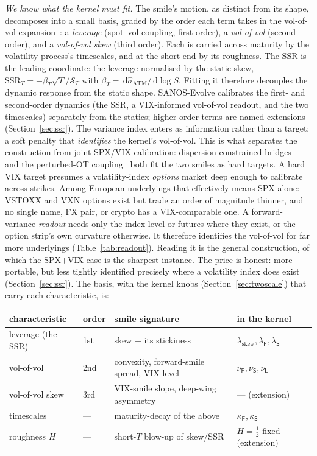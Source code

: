 \documentclass[11pt]{article}
\newcommand{\SSR}{\mathrm{SSR}}
\newcommand{\dd}{\,\mathrm{d}}
\begin{document}
\emph{We know what the kernel must fit.} The smile's motion, as distinct from its shape, decomposes
into a small basis, graded by the order each term takes in the vol-of-vol expansion~\cite{bergomi2016}:
a \emph{leverage} (spot--vol coupling, first order), a \emph{vol-of-vol} (second order), and a
\emph{vol-of-vol skew} (third order). Each is carried across maturity by the volatility process's
timescales, and at the short end by its roughness. The SSR is the leading coordinate: the leverage normalised by the static skew,
$\SSR_T=-\beta_T\sqrt{T}/\mathcal S_T$ with $\beta_T=\dd\widehat\sigma_{\mathrm{ATM}}/\dd\log S$.
Fitting it therefore decouples the dynamic response from the static shape. SANOS-Evolve calibrates the first- and second-order dynamics (the SSR, a VIX-informed
vol-of-vol readout, and the two timescales) separately from the statics; higher-order terms are named
extensions (Section~\ref{sec:ssr}). The variance index enters as information rather than a target: a
soft penalty that \emph{identifies} the kernel's vol-of-vol. This is what separates the construction
from joint SPX/VIX calibration: dispersion-constrained bridges~\cite{guyon2022} and the perturbed-OT
coupling~\cite{che2026pot} both fit the two smiles as hard targets. A hard VIX target presumes a volatility-index \emph{options} market deep enough to calibrate across
strikes. Among European underlyings that effectively means SPX alone: VSTOXX and VXN options exist but
trade an order of magnitude thinner, and no single name, FX pair, or crypto has a VIX-comparable one.
A forward-variance \emph{readout} needs only the index level or futures where they exist, or the option
strip's own curvature otherwise. It therefore identifies the vol-of-vol for far more underlyings
(Table~\ref{tab:readout}). Reading it is the general construction, of which the SPX$+$VIX case is the
sharpest instance. The price is honest: more portable, but less tightly identified precisely where a
volatility index does exist (Section~\ref{sec:ssr}). The basis, with
the kernel knobs (Section~\ref{sec:twoscale}) that carry each characteristic, is:
\begin{center}\small
\begin{tabular}{llll}
\toprule
characteristic & order & smile signature & in the kernel \\
\midrule
leverage (the SSR) & 1st & skew $+$ its stickiness & $\lambda_{\mathrm{skew}},\lambda_{\mathsf F},\lambda_{\mathsf S}$ \\
vol-of-vol & 2nd & convexity, forward-smile spread, VIX level & $\nu_{\mathsf F},\nu_{\mathsf S},\nu_{\mathsf L}$ \\
vol-of-vol skew & 3rd & VIX-smile slope, deep-wing asymmetry & --- (extension) \\
timescales & --- & maturity-decay of the above & $\kappa_{\mathsf F},\kappa_{\mathsf S}$ \\
roughness $H$ & --- & short-$T$ blow-up of skew/SSR & $H{=}\tfrac12$ fixed (extension) \\
\bottomrule
\end{tabular}
\end{center}
\end{document}
